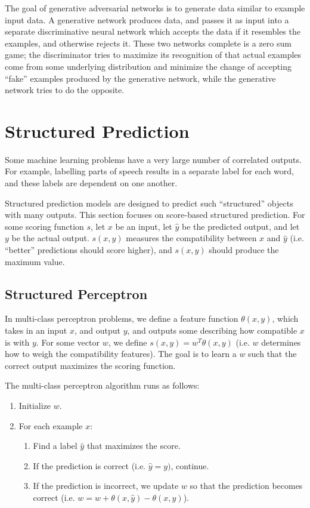 \documentclass[12pt,titlepage]{article}
\let\stdsection\section
\renewcommand\section{\clearpage\stdsection}
\begin{document}
      The goal of generative adversarial networks is to generate data similar to example input data. A generative network produces data, and passes it as input into
      a separate discriminative neural network which accepts the data if it resembles the examples, and otherwise rejects it. These two networks complete is a zero
      sum game; the discriminator tries to maximize its recognition of that actual examples come from some underlying distribution and minimize the change of accepting
      ``fake'' examples produced by the generative network, while the generative network tries to do the opposite.

  \section{Structured Prediction}
    Some machine learning problems have a very large number of correlated outputs. For example, labelling parts of speech results in a separate label for each word, and
    these labels are dependent on one another.

    Structured prediction models are designed to predict such ``structured'' objects with many outputs. This section focuses on score-based structured prediction. For some
    scoring function $s$, let $x$ be an input, let $\hat{y}$ be the predicted output, and let $y$ be the actual output. $s(x, \hat{y})$ measures the compatibility between
    $x$ and $\hat{y}$ (i.e. ``better'' predictions should score higher), and $s(x, y)$ should produce the maximum value.

    \subsection{Structured Perceptron}
      In multi-class perceptron problems, we define a feature function $\theta(x, y)$, which takes in an input $x$, and output $y$, and outputs some describing how compatible
      $x$ is with $y$. For some vector $w$, we define $s(x, y) = w^T\theta(x,y)$ (i.e. $w$ determines how to weigh the compatibility features). The goal is to learn a $w$
      such that the correct output maximizes the scoring function.

      The multi-class perceptron algorithm runs as follows:
      \begin{enumerate}
        \item Initialize $w$.
        \item For each example $x$:
          \begin{enumerate}
            \item Find a label $\hat{y}$ that maximizes the score.
            \item If the prediction is correct (i.e. $\hat{y} = y)$, continue.
            \item If the prediction is incorrect, we update $w$ so that the prediction becomes correct (i.e. $w = w + \theta(x, \hat{y}) - \theta(x, y)$).
          \end{enumerate}
      \end{enumerate}
\end{document}
